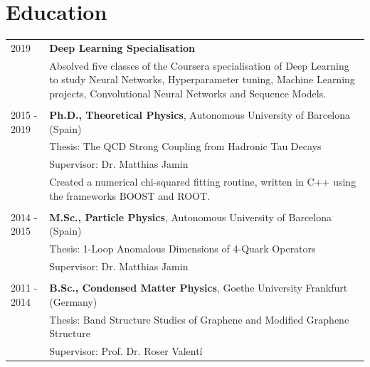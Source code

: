 \documentclass[11pt]{article}
\begin{document}
\begin{tabularx}{\textwidth}{lX}
\end{tabularx}


\section*{Education}
\begin{tabularx}{\textwidth}{lX}
  2019         & \textbf{Deep Learning Specialisation} \\
               & Absolved five classes of the Coursera specialisation of Deep Learning to study Neural Networks,
                 Hyperparameter tuning, Machine Learning projects, Convolutional Neural Networks and Sequence Models. \\\\
  2015 - 2019  & \textbf{Ph.D., Theoretical Physics}, Autonomous University of
                 Barcelona (Spain) \\
               & Thesis: The QCD Strong Coupling from Hadronic Tau
                 Decays \\
               & Supervisor: Dr. Matthias Jamin \\
               & Created a numerical chi-squared fitting routine, written in
                 C++ using the frameworks BOOST and ROOT. \\\\
  2014 - 2015  & \textbf{M.Sc., Particle Physics}, Autonomous University of
                                Barcelona (Spain) \\
               & Thesis: 1-Loop Anomalous Dimensions of 4-Quark
                 Operators \\
               & Supervisor: Dr. Matthias Jamin \\\\
  2011 - 2014  & \textbf{B.Sc., Condensed Matter Physics}, Goethe University Frankfurt (Germany) \\
               & Thesis: Band Structure Studies of Graphene and Modified
                 Graphene Structure \\
               & Supervisor: Prof. Dr. Roser Valentí
\end{tabularx}
		
\end{document}
